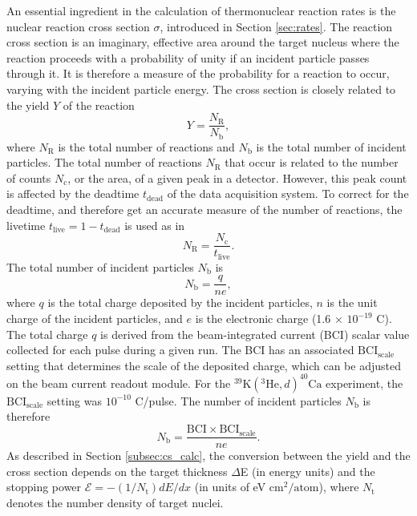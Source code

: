 An essential ingredient in the calculation of thermonuclear reaction rates is the nuclear reaction cross section $\sigma$, introduced in Section \ref{sec:rates}. The reaction cross section is an imaginary, effective area around the target nucleus where the reaction proceeds with a probability of unity if an incident particle passes through it. It is therefore a measure of the probability for a reaction to occur, varying with the incident particle energy. The cross section is closely related to the yield $Y$ of the reaction
\begin{equation}
Y = \frac{N_{\mathrm{R}}}{N_{\mathrm{b}}},
\end{equation}
where $N_{\mathrm{R}}$ is the total number of reactions and $N_{\mathrm{b}}$ is the total number of incident particles. The total number of reactions $N_{\mathrm{R}}$ that occur is related to the number of counts $N_{\mathrm{c}}$, or the area, of a given peak in a detector. However, this peak count is affected by the deadtime $t_{\mathrm{dead}}$ of the data acquisition system. To correct for the deadtime, and therefore get an accurate measure of the number of reactions, the livetime $t_{\mathrm{live}} = 1 - t_{\mathrm{dead}}$ is used as in
\begin{equation}
N_{\mathrm{R}} = \frac{N_{\mathrm{c}}}{t_{\mathrm{live}}}.
\end{equation}
The total number of incident particles $N_{\mathrm{b}}$ is
\begin{equation}
N_{\mathrm{b}} = \frac{q}{ne},
\end{equation}
where $q$ is the total charge deposited by the incident particles, $n$ is the unit charge of the incident particles, and $e$ is the electronic charge (1.6 $\times$ $10^{-19}$ C). The total charge $q$ is derived from the beam-integrated current (BCI) scalar value collected for each pulse during a given run. The BCI has an associated $\mathrm{BCI}_{\mathrm{scale}}$ setting that determines the scale of the deposited charge, which can be adjusted on the beam current readout module. For the $^{39}\mathrm{K}(^{3}\mathrm{He},d)^{40}\mathrm{Ca}$ experiment, the $\mathrm{BCI}_{\mathrm{scale}}$ setting was $10^{-10}$ C/pulse. The number of incident particles $N_{\mathrm{b}}$ is therefore
\begin{equation}
N_{\mathrm{b}} = \frac{\mathrm{BCI} \times \mathrm{BCI_{\mathrm{scale}}}}{ne}.
\end{equation}
As described in Section \ref{subsec:cs_calc}, the conversion between the yield and the cross section depends on the target thickness $\Delta$E (in energy units) and the stopping power $\mathcal{E} = -(1/N_{\mathrm{t}})dE/dx$ (in units of eV $\mathrm{cm}^{2} / \mathrm{atom}$), where $N_{\mathrm{t}}$ denotes the number density of target nuclei.


